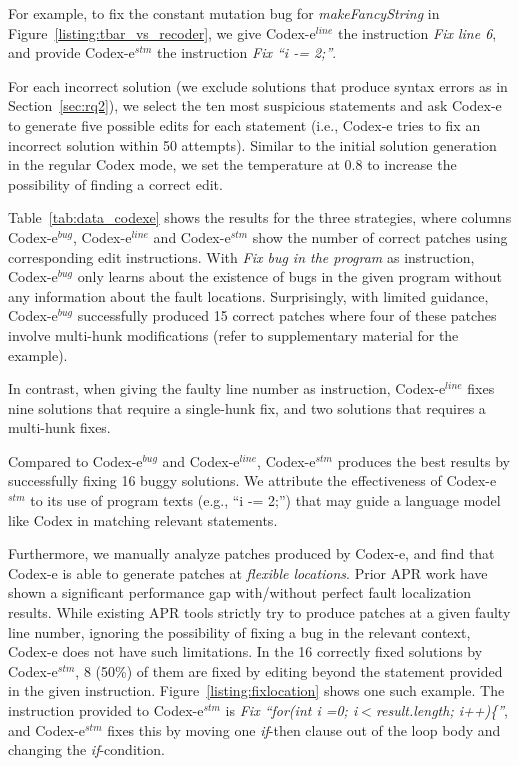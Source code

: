 For example, to fix the constant mutation bug for  \textit{makeFancyString} in Figure~\ref{listing:tbar_vs_recoder}, we give Codex-e$^{line}$ the instruction \emph{Fix line 6}, and provide Codex-e$^{stm}$ the instruction \emph{Fix ``i -= 2;''}.

For each incorrect solution (we exclude solutions that produce syntax errors as in Section~\ref{sec:rq2}), we select the ten most suspicious statements and ask Codex-e to generate five possible edits for each statement (i.e., Codex-e tries to fix an incorrect solution within 50 attempts). Similar to the initial solution generation in the regular Codex mode, we set the temperature at 0.8 to increase the possibility of finding a correct edit. 

Table~\ref{tab:data_codexe} shows the results for the three strategies, where columns Codex-e$^{bug}$, Codex-e$^{line}$ and Codex-e$^{stm}$ show the number of correct patches using corresponding edit instructions. With \emph{Fix bug in the program} as instruction, Codex-e$^{bug}$ only learns about the existence of bugs in the given program without any information about the fault locations. Surprisingly, with limited guidance, Codex-e$^{bug}$ successfully produced 15 correct patches where four of these patches involve multi-hunk modifications (refer to supplementary material for the example). 

In contrast, when giving the faulty line number as instruction, Codex-e$^{line}$ fixes nine solutions that require a single-hunk fix, and two solutions that requires a multi-hunk fixes.

Compared to Codex-e$^{bug}$ and Codex-e$^{line}$, Codex-e$^{stm}$ produces the best results by successfully fixing 16 buggy solutions. We attribute the effectiveness of Codex-e$^{stm}$ to its use of program texts (e.g., ``i -= 2;'') that may guide a language model like Codex in matching relevant statements.

Furthermore, we manually analyze patches produced by Codex-e, and find that Codex-e is able to generate patches at \emph{flexible locations}. Prior APR work \cite{tbar,recoder,lutellier2020coconut,jiang2021cure} have shown a significant performance gap with/without perfect fault localization results. While existing APR tools strictly try to produce patches at a given faulty line number, ignoring the possibility of fixing a bug in the relevant context, Codex-e does not have such limitations. In the 16 correctly fixed solutions by Codex-e$^{stm}$, 8 (50\%) of them are fixed by editing beyond the statement provided in the given instruction. Figure~\ref{listing:fixlocation} shows one such example. The instruction provided to Codex-e$^{stm}$ is \emph{Fix ``for(int i =0; i$<$result.length; i++)\{''}, and Codex-e$^{stm}$ fixes this by moving one \textit{if}-then clause out of the loop body and changing the \textit{if}-condition.

